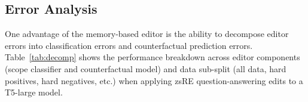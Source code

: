 


\subsection{Error Analysis}

One advantage of the memory-based editor is the ability to decompose editor errors into classification errors and counterfactual prediction errors. Table~\ref{tab:decomp} shows the performance breakdown across editor components (scope classifier and counterfactual model) and data sub-split (all data, hard positives, hard negatives, etc.) when applying zsRE question-answering edits to a T5-large model.

